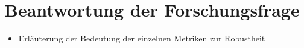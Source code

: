 \section{Beantwortung der Forschungsfrage}

\begin{itemize}
    \item Erläuterung der Bedeutung der einzelnen Metriken zur Robustheit
\end{itemize}